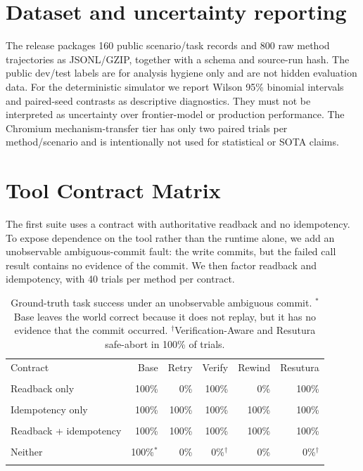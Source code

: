 \documentclass[10pt]{article}
\begin{document}
\section{Dataset and uncertainty reporting}
The release packages 160 public scenario/task records and 800 raw method trajectories as JSONL/GZIP, together with a schema and source-run hash. The public dev/test labels are for analysis hygiene only and are not hidden evaluation data. For the deterministic simulator we report Wilson 95\% binomial intervals and paired-seed contrasts as descriptive diagnostics. They must not be interpreted as uncertainty over frontier-model or production performance. The Chromium mechanism-transfer tier has only two paired trials per method/scenario and is intentionally not used for statistical or SOTA claims.

\section{Tool Contract Matrix}
The first suite uses a contract with authoritative readback and no idempotency. To expose dependence on the tool rather than the runtime alone, we add an unobservable ambiguous-commit fault: the write commits, but the failed call result contains no evidence of the commit. We then factor readback and idempotency, with 40 trials per method per contract.

\begin{table}[h]
\centering
\small
\begin{tabular}{lrrrrr}
\toprule
Contract & Base & Retry & Verify & Rewind & Resutura \\\\
\midrule
Readback only & 100\% & 0\% & 100\% & 0\% & 100\% \\\\
Idempotency only & 100\% & 100\% & 100\% & 100\% & 100\% \\\\
Readback + idempotency & 100\% & 100\% & 100\% & 100\% & 100\% \\\\
Neither & 100\%$^*$ & 0\% & 0\%$^\dagger$ & 0\% & 0\%$^\dagger$ \\\\
\bottomrule
\end{tabular}
\caption{Ground-truth task success under an unobservable ambiguous commit. $^*$Base leaves the world correct because it does not replay, but it has no evidence that the commit occurred. $^\dagger$Verification-Aware and Resutura safe-abort in 100\% of trials.}
\end{table}
\end{document}
